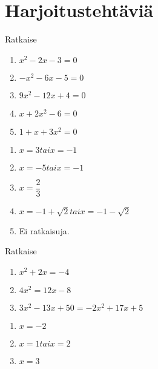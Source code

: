 \section{Harjoitustehtäviä}

\begin{tehtava}
    Ratkaise
    \begin{enumerate}
        \item $x^2 - 2x - 3 = 0$
        \item $-x^2 - 6x - 5 = 0$
        \item $9x^2 - 12x + 4 = 0$
        \item $x + 2x^2 - 6= 0$
        \item $1 + x + 3x^2= 0$
    \end{enumerate}
    \begin{vastaus}
        \begin{enumerate}
            \item $x = 3 tai x = -1$
            \item $x = -5 tai x = -1$
            \item $x = \dfrac{2}{3}$
            \item $x = -1 + \sqrt{2} tai x = -1 - \sqrt{2}$
            \item Ei ratkaisuja.
        \end{enumerate}
    \end{vastaus}
\end{tehtava}

\begin{tehtava}
    Ratkaise
    \begin{enumerate}
        \item $x^2 + 2x = -4$
        \item $4x^2 = 12x - 8$
        \item $3x^2 - 13x + 50 = -2x^2 + 17x + 5$
    \end{enumerate}
    \begin{vastaus}
        \begin{enumerate}
            \item $x = -2$
            \item $x = 1 tai x = 2$
            \item $x = 3$
        \end{enumerate}
    \end{vastaus}
\end{tehtava}

